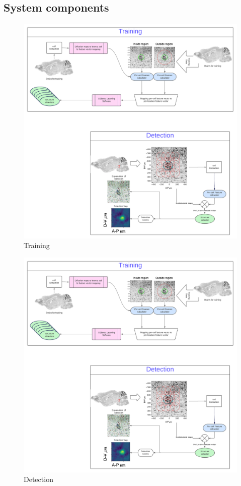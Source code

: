 \documentclass[runningheads]{llncs}
\begin{document}
\subsection{System components}
\begin{figure}[t]
  \includegraphics[width=\textwidth]{figures/Training.pdf}
  \caption{Training}
\end{figure}
\begin{figure}[t]
  \includegraphics[width=\textwidth]{figures/detection.pdf}
  \caption{Detection}
\end{figure}
\end{document}

